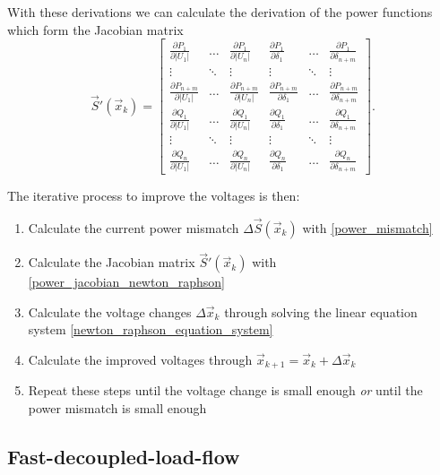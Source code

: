 With these derivations we can calculate the derivation of the power functions which form the Jacobian matrix
\begin{equation}
	\vec S' (\vec x_k) = 
	\begin{bmatrix}
		\frac{\partial P_1}{\partial |U_1|}	& \hdots	& \frac{\partial P_1}{\partial |U_n|}	& \frac{\partial P_1}{\partial \delta_1}	& \hdots	& \frac{\partial P_1}{\partial \delta_{n + m}} \\
		\vdots								& \ddots	& \vdots								& \vdots									& \ddots	& \vdots \\
		\frac{\partial P_{n + m}}{\partial |U_1|}	& \hdots	& \frac{\partial P_{n + m}}{\partial |U_n|}	& \frac{\partial P_{n + m}}{\partial \delta_1}	& \hdots	& \frac{\partial P_{n + m}}{\partial \delta_{n + m}} \\
		\frac{\partial Q_1}{\partial |U_1|}	& \hdots	& \frac{\partial Q_1}{\partial |U_n|}	& \frac{\partial Q_1}{\partial \delta_1}	& \hdots	& \frac{\partial Q_1}{\partial \delta_{n + m}} \\
		\vdots								& \ddots	& \vdots								& \vdots									& \ddots	& \vdots \\
		\frac{\partial Q_n}{\partial |U_1|}	& \hdots	& \frac{\partial Q_n}{\partial |U_n|}	& \frac{\partial Q_n}{\partial \delta_1}	& \hdots	& \frac{\partial Q_n}{\partial \delta_{n + m}}
	\end{bmatrix}.
	\label{eq:power_jacobian_newton_raphson}
\end{equation}

The iterative process to improve the voltages is then:
\begin{enumerate}
	\item Calculate the current power mismatch $\Delta \vec S (\vec x_k)$ with \eqref{power_mismatch}
	\item Calculate the Jacobian matrix $\vec S' (\vec x_k)$ with \eqref{power_jacobian_newton_raphson}
	\item Calculate the voltage changes $\Delta \vec x_k$ through solving the linear equation system \eqref{newton_raphson_equation_system}
	\item Calculate the improved voltages through $\vec x_{k + 1} = \vec x_k + \Delta \vec x_k$
	\item Repeat these steps until the voltage change is small enough \emph{or} until the power mismatch is small enough
\end{enumerate}

\subsection{Fast-decoupled-load-flow}
\label{sec:fdlf}

